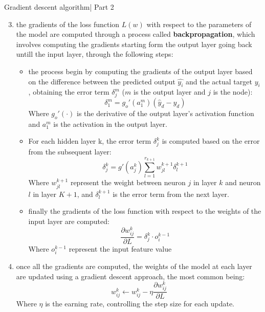 \begin{itemize}
\begin{tcolorbox} [colback=blue!5, colframe=blue!80, boxrule=0pt]
    \begin{algorithm} [H]
    \setcounter{algorithm}{4}
    \caption{Gradient descent algorithm| Part 2}
    \begin{enumerate}
    \setcounter{enumi}{2}
            \item the gradients of the loss function $L(w)$ with respect to the parameters of the model are computed through a process called \textbf{backpropagation}, which involves computing the gradients starting form the output layer going back untill the input layer, through the following steps:
            \begin{itemize}
                \item the process begin by computing the gradients of the output layer based on the difference between the predicted output $\hat{y_i}$ and the actual target $y_i$, obtaining the error term $\delta_j^m$ ($m$ is the output layer and $j$ is the node):
                \[
                \delta_1^m = g_o'(a_1^m)(\hat{y}_d - y_d)
                \]
                Where $g_o'(\cdot)$ is the derivative of the output layer’s activation function and $a_1^m$ is the activation in the output layer.
                \item For each hidden layer k, the error term $\delta_j^k$ is computed based on the error from the subsequent layer:
                \[
                \delta_j^k = g'(a_j^k) \sum_{l=1}^{r_{k+1}} w_{jl}^{k+1} \delta_l^{k+1}
                \]
                Where $w_{jl}^{k+1}$ represent the weight between neuron $j$ in layer $k$ and neuron $l$ in layer $K+1$, and $\delta_l^{k+1}$ is the error term from the next layer.

                \item finally the gradients of the loss function with respect to the weights of the input layer are computed:
                \[
                \frac{\partial w_{ij}^k}{\partial L} = \delta_j^k \cdot o_i^{k-1}
                \]
                Where $o_i^{k-1}$ represent the input feature value
            \end{itemize}
            \item once all the gradients are computed, the weights of the model at each layer are updated using a gradient descent approach, the most common being: 
            \[
            w_{ij}^k \leftarrow w_{ij}^k - \eta \frac{\partial w_{ij}^k}{\partial L}
            \]
            Where $\eta$ is the earning rate, controlling the step size for each update.
        \end{enumerate}
        \end{algorithm}
    \end{tcolorbox}



\end{itemize}
